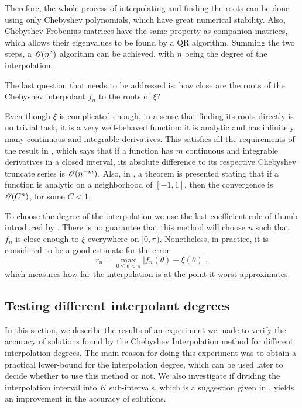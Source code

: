 Therefore, the whole process of interpolating and finding the roots can be done using only Chebyshev polynomials, which have great numerical stability. Also, Chebyshev-Frobenius matrices have the same property as companion matrices, which allows their eigenvalues to be found by a QR algorithm. Summing the two steps, a $\mathscr{O}(n^3)$ algorithm can be achieved, with $n$ being the degree of the interpolation.

The last question that needs to be addressed is: how close are the roots of the Chebyshev interpolant $f_n$ to the roots of $\xi$?

Even though $\xi$ is complicated enough, in a sense that finding its roots directly is no trivial task, it is a very well-behaved function: it is analytic and has infinitely many continuous and integrable derivatives. This satisfies all the requirements of the result in , which says that if a function has $m$ continuous and integrable derivatives in a closed interval, its absolute difference to its respective Chebyshev truncate series is $\mathscr{O}(n^{-m})$. Also, in , a theorem is presented stating that if a function is analytic on a neighborhood of $[-1, 1]$, then the convergence is $\mathscr{O}(C^n)$, for some $C<1$.

To choose the degree of the interpolation we use the last coefficient rule-of-thumb introduced by . There is no guarantee that this method will choose $n$ such that $f_n$ is close enough to $\xi$ everywhere on $[0, \pi)$. Nonetheless, in practice, it is considered to be a good estimate for the error
\begin{equation}
r_n = \max_{0 \le \theta < \pi} |f_n(\theta) - \xi(\theta)|,
\end{equation}
which measures how far the interpolation is at the point it worst approximates. 
\clearpage
\subsection{Testing different interpolant degrees}

In this section, we describe the results of an experiment we made to verify the accuracy of solutions found by the Chebyshev Interpolation method for different interpolation degrees. 
The main reason for doing this experiment was to obtain a practical lower-bound for the interpolation degree, which can be used later to decide whether to use this method or not. We also investigate if dividing the interpolation interval into $K$ sub-intervals, which is a suggestion given in , yields an improvement in the accuracy of solutions. 

